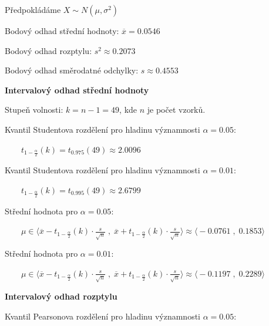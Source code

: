 \documentclass[11pt, a4paper, titlepage]{article}
\begin{document}
Předpokládáme ${\displaystyle X \sim N(\mu, \sigma^2)}$
\medskip

Bodový odhad střední hodnoty: ${\displaystyle \overline{x} = 0.0546}$
\medskip

Bodový odhad rozptylu: ${\displaystyle s^2 \approx 0.2073}$
\medskip

Bodový odhad směrodatné odchylky: ${\displaystyle s \approx 0.4553}$
\bigskip
\bigskip



\textbf{Intervalový odhad střední hodnoty}
\medskip

Stupeň volnosti: ${\displaystyle k = n - 1 = 49}$, kde $n$ je počet vzorků.
\medskip

Kvantil Studentova rozdělení pro hladinu významnosti ${\displaystyle \alpha = 0.05}$:
\medskip

${\displaystyle \qquad t_{1 - \frac{\alpha}{2}}(k) = t_{0.975}(49) \approx 2.0096}$
\medskip

Kvantil Studentova rozdělení pro hladinu významnosti ${\displaystyle \alpha = 0.01}$:
\medskip

${\displaystyle \qquad t_{1 - \frac{\alpha}{2}}(k) = t_{0.995}(49) \approx 2.6799}$
\medskip

Střední hodnota pro ${\displaystyle \alpha = 0.05 :}$
\medskip


${\displaystyle \qquad \mu \in \bigg\langle \overline{x} - t_{1 - \frac{\alpha}{2}}(k) \cdot \frac{s}{\sqrt{n}} \;,\; \overline{x} + t_{1 - \frac{\alpha}{2}}(k) \cdot \frac{s}{\sqrt{n}} \bigg\rangle \approx \bigg\langle -0.0761 \;,\; 0.1853 \bigg\rangle}$
\medskip

Střední hodnota pro ${\displaystyle \alpha = 0.01 :}$
\medskip


${\displaystyle \qquad \mu \in \bigg\langle \overline{x} - t_{1 - \frac{\alpha}{2}}(k) \cdot \frac{s}{\sqrt{n}} \;,\; \overline{x} + t_{1 - \frac{\alpha}{2}}(k) \cdot \frac{s}{\sqrt{n}} \bigg\rangle \approx \bigg\langle -0.1197 \;,\; 0.2289 \bigg\rangle}$
\bigskip
\bigskip


\textbf{Intervalový odhad rozptylu}
\medskip

Kvantil Pearsonova rozdělení pro hladinu významnosti ${\displaystyle \alpha = 0.05}$:
\medskip
\end{document}
